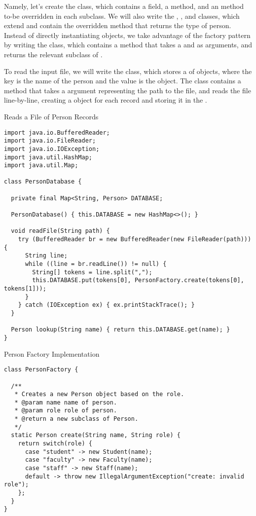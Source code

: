 Namely, let's create the   class, which contains a  field, a  method, and an   method to-be overridden in each subclass. We will also write the , , and  classes, which extend  and contain the overridden  method that returns the type of person. Instead of directly instantiating  objects, we take advantage of the factory pattern by writing the  class, which contains a  method that takes a  and  as arguments, and returns the relevant subclass of .

To read the input file, we will write the  class, which stores a  of  objects, where the key is the name of the person and the value is the  object. The  class contains a  method that takes a  argument representing the path to the file, and reads the file line-by-line, creating a  object for each record and storing it in the .

\begin{cl}{Reads a File of Person Records}
\begin{lstlisting}[language=MyJava]
import java.io.BufferedReader;
import java.io.FileReader;
import java.io.IOException;
import java.util.HashMap;
import java.util.Map;

class PersonDatabase {

  private final Map<String, Person> DATABASE;

  PersonDatabase() { this.DATABASE = new HashMap<>(); }

  void readFile(String path) {
    try (BufferedReader br = new BufferedReader(new FileReader(path))) {
      String line;
      while ((line = br.readLine()) != null) {
        String[] tokens = line.split(",");
        this.DATABASE.put(tokens[0], PersonFactory.create(tokens[0], tokens[1]));
      }
    } catch (IOException ex) { ex.printStackTrace(); }
  }

  Person lookup(String name) { return this.DATABASE.get(name); }
}
\end{lstlisting}
\end{cl}

\begin{cl}{Person Factory Implementation}
\begin{lstlisting}[language=MyJava]
class PersonFactory {
  
  /**
   * Creates a new Person object based on the role.
   * @param name name of person.
   * @param role role of person.
   * @return a new subclass of Person.
   */
  static Person create(String name, String role) {
    return switch(role) {
      case "student" -> new Student(name);
      case "faculty" -> new Faculty(name);
      case "staff" -> new Staff(name);
      default -> throw new IllegalArgumentException("create: invalid role");
    };
  }
}
\end{lstlisting}
\end{cl}

